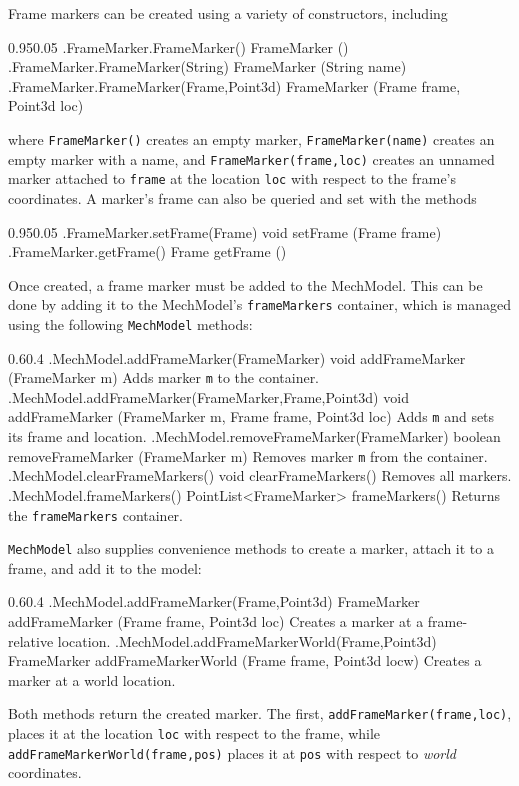 Frame markers can be created using a variety of constructors, including
%
\begin{methodtable}{0.95}{0.05}
\midline
%
\methodentry
{\mech.FrameMarker.FrameMarker()}%
{FrameMarker ()}%
{\ }%
%
\methodentry
{\mech.FrameMarker.FrameMarker(String)}%
{FrameMarker (String name)}%
{\ }%
%
\methodentry
{\mech.FrameMarker.FrameMarker(Frame,Point3d)}%
{FrameMarker (Frame frame, Point3d loc)}%
{\ }%
%
\midline
\end{methodtable}
%
where {\tt FrameMarker()} creates an empty marker, {\tt FrameMarker(name)}
creates an empty marker with a name, and {\tt FrameMarker(frame,loc)} creates
an unnamed marker attached to {\tt frame} at the location {\tt loc} with
respect to the frame's coordinates. A marker's frame can also be queried and
set with the methods
%
\begin{methodtable}{0.95}{0.05}
\midline
%
\methodentry
{\mech.FrameMarker.setFrame(Frame)}%
{void setFrame (Frame frame)}%
{\ }%
%
\methodentry
{\mech.FrameMarker.getFrame()}%
{Frame getFrame ()}%
{\ }%
%
\midline
\end{methodtable}
%

Once created, a frame marker must be added to the MechModel. This can be
done by adding it to the MechModel's {\tt frameMarkers} container, which is
managed using the following {\tt MechModel} methods:
%
\begin{methodtable}{0.6}{0.4}
\midline
%
\methodentry
{\mech.MechModel.addFrameMarker(FrameMarker)}%
{void addFrameMarker (FrameMarker m)}%
{Adds marker {\tt m} to the container.}%
%
\methodentry
{\mech.MechModel.addFrameMarker(FrameMarker,Frame,Point3d)}%
{void addFrameMarker (FrameMarker m, Frame frame, Point3d loc)}%
{Adds {\tt m} and sets its frame and location.}%
%
\methodentry
{\mech.MechModel.removeFrameMarker(FrameMarker)}%
{boolean removeFrameMarker (FrameMarker m)}%
{Removes marker {\tt m} from the container.}%
%
\methodentry
{\mech.MechModel.clearFrameMarkers()}%
{void clearFrameMarkers()}%
{Removes all markers.}%
%
\methodentry
{\mech.MechModel.frameMarkers()}%
{PointList<FrameMarker> frameMarkers()}%
{Returns the {\tt frameMarkers} container.}%
%
\midline
\end{methodtable}
%

{\tt MechModel} also supplies convenience methods to create a
marker, attach it to a frame, and add it to the model:
%
\begin{methodtable}{0.6}{0.4}
\midline
%
\methodentry
{\mech.MechModel.addFrameMarker(Frame,Point3d)}%
{FrameMarker addFrameMarker (Frame frame, Point3d loc)}%
{Creates a marker at a frame-relative location.}%
%
\methodentry
{\mech.MechModel.addFrameMarkerWorld(Frame,Point3d)}%
{FrameMarker addFrameMarkerWorld (Frame frame, Point3d locw)}%
{Creates a marker at a world location.}%
%
\midline
\end{methodtable}
%
Both methods return the created marker.
The first, {\tt addFrameMarker(frame,loc)}, places it at the
location {\tt loc} with respect to the frame, while {\tt
addFrameMarkerWorld(frame,pos)} places it at {\tt pos} with respect to
{\it world} coordinates.


